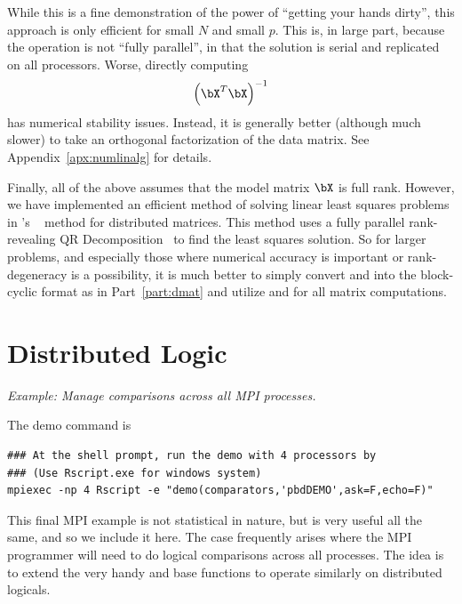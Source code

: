 While this is a fine demonstration of the power of ``getting your hands dirty'', this approach is only efficient for small $N$ and small $p$.  This is, in large part, because the operation is not ``fully parallel'', in that the solution is serial and replicated on all processors.  Worse, directly computing
\begin{align*}
\left(\bX^T\bX\right)^{-1}
\end{align*}
has numerical stability issues.  Instead, it is generally better (although much slower) to take an orthogonal factorization of the data matrix.  See Appendix~\ref{apx:numlinalg} for details.

Finally, all of the above assumes that the model matrix $\bX$ is full rank.  However, we have implemented an efficient method of solving linear least squares problems in 's
~
method for distributed matrices.  This method uses a fully parallel rank-revealing
QR Decomposition~
to find the least squares solution.  So for larger problems, and especially those where numerical accuracy is important or rank-degeneracy is a possibility, it is much better to simply convert  and  into the block-cyclic format as in Part~\ref{part:dmat} and utilize  and  for all matrix computations.








\section{Distributed Logic}%

\emph{Example:  Manage comparisons across all MPI processes.}

The demo command is
\begin{lstlisting}
### At the shell prompt, run the demo with 4 processors by
### (Use Rscript.exe for windows system)
mpiexec -np 4 Rscript -e "demo(comparators,'pbdDEMO',ask=F,echo=F)"
\end{lstlisting}

This final MPI example is not statistical in nature, but is very useful all the same, and so we include it here.  The case frequently arises where the MPI programmer will need to do logical comparisons across all processes.  The idea is to extend the very handy  and  base  functions to operate similarly on distributed logicals.


